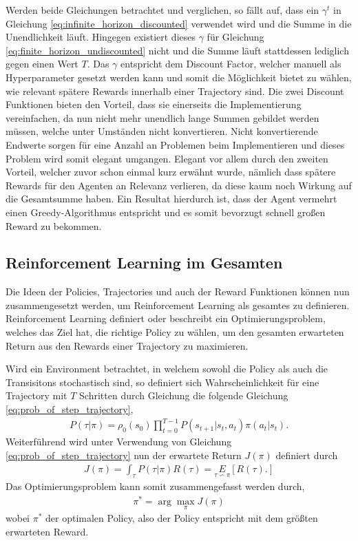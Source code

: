 \documentclass[]{iat}
\begin{document}
Werden beide Gleichungen betrachtet und verglichen, so fällt auf, dass ein $\gamma^t$ in Gleichung \ref{eq:infinite_horizon_discounted} verwendet wird und die Summe in die Unendlichkeit läuft. Hingegen existiert dieses $\gamma$ für Gleichung \ref{eq:finite_horizon_undiscounted} nicht und die Summe läuft stattdessen lediglich gegen einen Wert $T$. Das $\gamma$ entspricht dem Discount Factor, welcher manuell als Hyperparameter gesetzt werden kann und somit die Möglichkeit bietet zu wählen, wie relevant spätere Rewards innerhalb einer Trajectory sind. Die zwei Discount Funktionen bieten den Vorteil, dass sie einerseits die Implementierung vereinfachen, da nun nicht mehr unendlich lange Summen gebildet werden müssen, welche unter Umständen nicht konvertieren. Nicht konvertierende Endwerte sorgen für eine Anzahl an Problemen beim Implementieren und dieses Problem wird somit elegant umgangen. Elegant vor allem durch den zweiten Vorteil, welcher zuvor schon einmal kurz erwähnt wurde, nämlich dass spätere Rewards für den Agenten an Relevanz verlieren, da diese kaum noch Wirkung auf die Gesamtsumme haben. Ein Resultat hierdurch ist, dass der Agent vermehrt einen Greedy-Algorithmus entspricht und es somit bevorzugt schnell großen Reward zu bekommen.

\subsection{Reinforcement Learning im Gesamten}
Die Ideen der Policies, Trajectories und auch der Reward Funktionen können nun zusammengesetzt werden, um Reinforcement Learning als gesamtes zu definieren. Reinforcement Learning definiert oder beschreibt ein Optimierungsproblem, welches das Ziel hat, die richtige Policy zu wählen, um den gesamten erwarteten Return aus den Rewards einer Trajectory zu maximieren.

Wird ein Environment betrachtet, in welchem sowohl die Policy als auch die Transisitons stochastisch sind, so definiert sich Wahrscheinlichkeit für eine Trajectory mit $T$ Schritten durch Gleichung die folgende Gleichung \ref{eq:prob_of_step_trajectory},
\begin{align}
    P(\tau | \pi) = \rho_0(s_0) \prod _{t = 0}^{T-1} P\left(s_{t+1}|s_t,a_t\right)\pi(a_t|s_t). \label{eq:prob_of_step_trajectory}
\end{align}
Weiterführend wird unter Verwendung von Gleichung \ref{eq:prob_of_step_trajectory} nun der erwartete Return $J(\pi)$ definiert durch
\begin{align}
    J(\pi) = \int_{\tau}^{} P(\tau | \pi) R(\tau) = \underset{\tau \backsim \pi}{E}\left[R(\tau).\right] \label{eq:expected_return}
\end{align}
Das Optimierungsproblem kann somit zusammengefasst werden durch,
\begin{align}
    \pi^* = \arg \underset{\pi}{\max} J(\pi) \label{eq:optimized_problem}
\end{align}
wobei $\pi^*$ der optimalen Policy, also der Policy entspricht mit dem größten erwarteten Reward.
\end{document}
